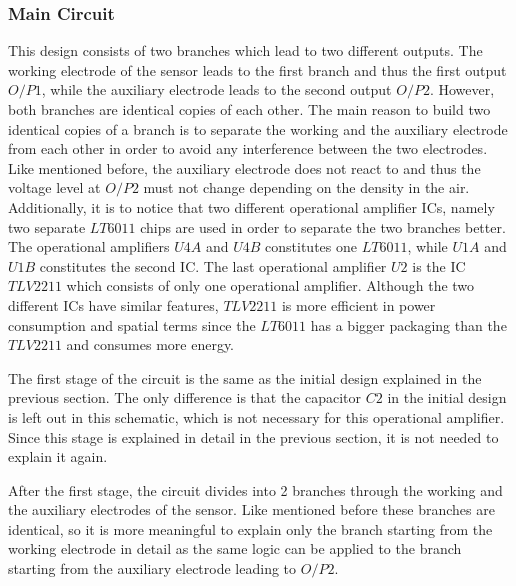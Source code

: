 \subsubsection{Main Circuit}
This design consists of two branches which lead to two different outputs. The working electrode of the sensor leads to the first branch and thus the first output $O/P1$, while the auxiliary electrode leads to the second output $O/P2$. However, both branches are identical copies of each other. The main reason to build two identical copies of a branch is to separate the working and the auxiliary electrode from each other in order to avoid any interference between the two electrodes. Like mentioned before, the auxiliary electrode does not react to  and thus the voltage level at $O/P2$ must not change depending on the  density in the air. Additionally, it is to notice that two different operational amplifier ICs, namely two separate $LT6011$ chips are used in order to separate the two branches better. The operational amplifiers $U4A$ and $U4B$ constitutes one $LT6011$, while $U1A$ and $U1B$ constitutes the second IC. The last operational amplifier $U2$ is the IC $TLV2211$ which consists of only one operational amplifier. Although the two different ICs have similar features, $TLV2211$ is more efficient in power consumption and spatial terms since the $LT6011$ has a bigger packaging than the $TLV2211$ and consumes more energy. \cite{TLV2211} \cite{LT6011}\par
The first stage of the circuit is the same as the initial design explained in the previous section. The only difference is that the capacitor $C2$ in the initial design is left out in this schematic, which is not necessary for this operational amplifier. \cite{2009} Since this stage is explained in detail in the previous section, it is not needed to explain it again. \par 
After the first stage, the circuit divides into 2 branches through the working and the auxiliary electrodes of the sensor. Like mentioned before these branches are identical, so it is more meaningful to explain only the branch starting from the working electrode in detail as the same logic can be applied to the branch starting from the auxiliary electrode leading to $O/P2$.\par
